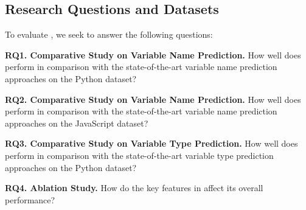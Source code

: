 \subsection{Research Questions and Datasets}

To evaluate {\tool}, we seek to answer the following questions:

\noindent\textbf{RQ1. Comparative Study on Variable Name Prediction.}  How well does {\tool} perform in comparison with the state-of-the-art variable name prediction approaches on the Python dataset?

    \noindent\textbf{RQ2. Comparative Study on Variable Name Prediction.}  How well does {\tool} perform in comparison with the state-of-the-art variable name prediction approaches on the JavaScript dataset?

\noindent\textbf{RQ3. Comparative Study on Variable Type Prediction.}  How well does {\tool} perform in comparison with the state-of-the-art variable type prediction approaches on the Python dataset?

\noindent\textbf{RQ4. Ablation Study.} How do the key features in {\tool} affect its overall performance?


